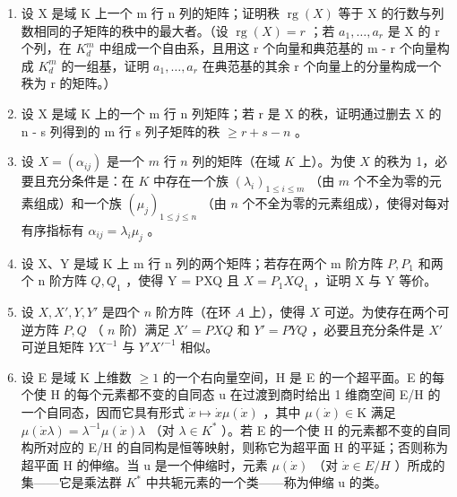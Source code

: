 \begin{enumerate}
\def\labelenumi{\arabic{enumi}.}
\setcounter{enumi}{5}
\item
  设 X 是域 K 上一个 m 行 n 列的矩阵；证明秩 \(\operatorname{rg}(X)\) 等于 X 的行数与列数相同的子矩阵的秩中的最大者。（设 \(\operatorname{rg}(X) = r\) ；若 \(a_{1}, \ldots, a_{r}\) 是 X 的 r 个列，在 \(K_{d}^{m}\) 中组成一个自由系，且用这 r 个向量和典范基的 m - r 个向量构成 \(K_{d}^{m}\) 的一组基，证明 \(a_{1}, \ldots, a_{r}\) 在典范基的其余 r 个向量上的分量构成一个秩为 r 的矩阵。）
\item
  设 X 是域 K 上的一个 m 行 n 列矩阵；若 r 是 X 的秩，证明通过删去 X 的 n - s 列得到的 m 行 s 列子矩阵的秩 \(\geqslant r + s - n\) 。
\item
  设 \(X = (\alpha_{ij})\) 是一个 \(m\) 行 \(n\) 列的矩阵（在域 \(K\) 上）。为使 \(X\) 的秩为 1，必要且充分条件是：在 \(K\) 中存在一个族 \((\lambda_i)_{1 \leqslant i \leqslant m}\) （由 \(m\) 个不全为零的元素组成）和一个族 \((\mu_j)_{1 \leqslant j \leqslant n}\) （由 \(n\) 个不全为零的元素组成），使得对每对有序指标有 \(\alpha_{ij} = \lambda_i \mu_j\) 。
\item
  设 X、Y 是域 K 上 m 行 n 列的两个矩阵；若存在两个 m 阶方阵 \(P, P_{1}\) 和两个 n 阶方阵 \(Q, Q_{1}\) ，使得 Y = PXQ 且 \(X = P_{1}XQ_{1}\) ，证明 X 与 Y 等价。
\item
  设 \(X, X', Y, Y'\) 是四个 \(n\) 阶方阵（在环 \(A\) 上），使得 \(X\) 可逆。为使存在两个可逆方阵 \(P, Q\) （ \(n\) 阶）满足 \(X' = PXQ\) 和 \(Y' = PYQ\) ，必要且充分条件是 \(X'\) 可逆且矩阵 \(YX^{-1}\) 与 \(Y'X'^{-1}\) 相似。
\item
  设 E 是域 K 上维数 \(\geqslant1\) 的一个右向量空间，H 是 E 的一个超平面。E 的每个使 H 的每个元素都不变的自同态 u 在过渡到商时给出 1 维商空间 E/H 的一个自同态，因而它具有形式 \(\dot{x}\mapsto\dot{x}\mu(\dot{x})\) ，其中 \(\mu(\dot{x})\in\mathrm{K}\) 满足 \(\mu(\dot{x}\lambda)=\lambda^{-1}\mu(\dot{x})\lambda\) （对 \(\lambda\in K^{*}\) ）。若 E 的一个使 H 的元素都不变的自同构所对应的 E/H 的自同构是恒等映射，则称它为超平面 H 的平延；否则称为超平面 H 的伸缩。当 u 是一个伸缩时，元素 \(\mu(\dot{x})\) （对 \(\dot{x}\in E/H\) ）所成的集——它是乘法群 \(K^{*}\) 中共轭元素的一个类——称为伸缩 u 的类。
\end{enumerate}

